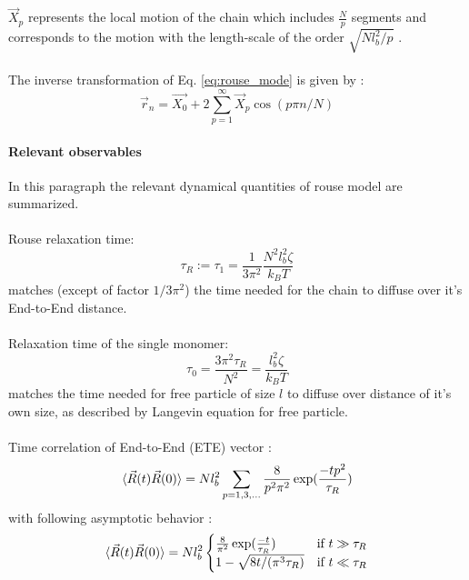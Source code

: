 \documentclass[
    paper=A4,pagesize=automedia,fontsize=12pt,
    BCOR=15mm,DIV=22,
    twoside,headinclude,footinclude=false,
    fleqn,             %
    bibliography=totocnumbered,          %
    listof=totoc,                %
    listof=flat,                 %
    cleardoublepage=empty      %
    numbers=endperiod
]{scrartcl}
\begin{document}
$\vec{X}_p$ represents the local motion of the chain which includes $\frac{N}{p}$ segments and corresponds to the
motion with the length-scale of the order $\sqrt{Nl_b^2/p}$ \cite{Doi_Edwards_PD:1994}.
\\
\\
The inverse transformation of Eq. \ref{eq:rouse_mode} is given by \cite{Doi_Edwards_PD:1994}:
\begin{equation}
    \vec{r}_n = \vec{X_0} + 2 \sum_{p=1}^{\infty} \vec{X}_p \cos(p \pi n  / N)
\end{equation}

\paragraph{Relevant observables}
In this paragraph the relevant dynamical quantities of rouse model are summarized.
\\
\\
Rouse relaxation time:
\begin{equation} \label{eq:rouse_relaxation_time}
    \tau_R := \tau_1 = \frac{1}{3 \pi^2} \frac{N^2 l_b^2 \zeta}{k_B T} 
\end{equation}
matches (except of factor $1/3\pi^2$) the time needed for the chain to diffuse over it's End-to-End distance.
\\
\\
Relaxation time of the single monomer:
\begin{equation}
    \tau_0 = \frac{3 \pi^2 \tau_R}{N^2} = \frac{l_b^2 \zeta}{k_B T}
\end{equation}
matches the time needed for free particle of size $l$ to diffuse over distance
of it's own size, as described by Langevin equation for free particle.
\\
\\
Time correlation of End-to-End (ETE) vector \cite{Doi_Edwards_PD:1994}:
\begin{equation}
    \langle\vec{R}(t)\vec{R}(0)\rangle = Nl_b^2 \sum_{p=1,3,\ldots} \frac{8}{p^2\pi^2}\exp(\frac{-t p^2}{\tau_R})
\end{equation}
with following asymptotic behavior \cite{Nikoubashman2016}:
\begin{equation}
    \langle\vec{R}(t)\vec{R}(0)\rangle = Nl_b^2 \begin{cases}
        \frac{8}{\pi^2} \exp(\frac{-t}{\tau_R}) & \text{if } t \gg \tau_R \\
        1 - \sqrt{8t/(\pi^3\tau_R)} & \text{if } t \ll \tau_R
    \end{cases}
\end{equation}
\end{document}

